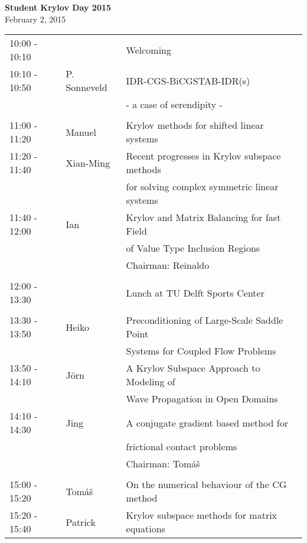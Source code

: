 \documentclass{article}
\begin{document}
\begin{center}
 \textbf{\Large{Student Krylov Day 2015}}
 \\
 \vspace{1cm}
 February 2, 2015
\end{center}


\begin{table}[h]
\begin{tabular}{lll}
10:00 - 10:10 &  & Welcoming \\ [0.5ex]
10:10 - 10:50 & P. Sonneveld & IDR-CGS-BiCGSTAB-IDR(s) \\
 & & - a case of serendipity -\\ [0.5ex]
\hline \\ [-1.5ex]
11:00 - 11:20 & Manuel & Krylov methods for shifted linear systems \\ [0.5ex]
11:20 - 11:40 & Xian-Ming & Recent progresses in Krylov subspace methods\\ 
                        & & for solving complex symmetric linear systems\\  [0.5ex]
11:40 - 12:00 & Ian & Krylov and Matrix Balancing for fast Field \\ 
              &     & of Value Type Inclusion Regions\\  [0.5ex]
& & \hfill \small{Chairman: Reinaldo }  \\
\hline \\ [-1.5ex]
12:00 - 13:30 & & Lunch at TU Delft Sports Center \\ [0.5ex]
\hline \\ [-1.5ex]
13:30 - 13:50 & Heiko & Preconditioning of Large-Scale Saddle Point \\
                    & & Systems for Coupled Flow Problems\\ [0.5ex]
13:50 - 14:10 &J\"orn & A Krylov Subspace Approach to Modeling of \\
                     & & Wave Propagation in Open Domains\\ [0.5ex]
14:10 - 14:30 & Jing & A conjugate gradient based method for \\
                   & & frictional contact problems\\ [0.5ex]
& & \hfill \small{Chairman: Tom{\'a}{\v s}} \\
\hline \\ [-1.5ex]
15:00 - 15:20 & Tom{\'a}{\v s} & On the numerical behaviour of the CG method\\ [0.5ex]
15:20 - 15:40 & Patrick & Krylov subspace methods for matrix equations \\

\end{tabular}
\end{table}
\end{document}
